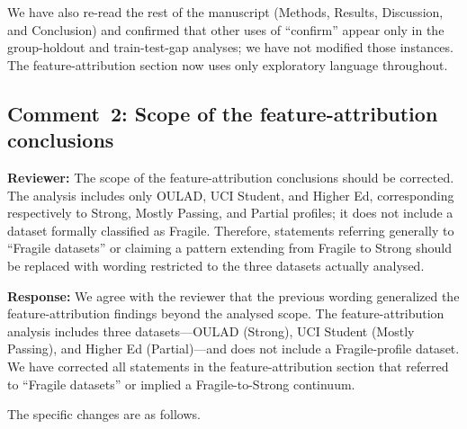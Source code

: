 \documentclass[10pt,letterpaper]{article}
\begin{document}
We have also re-read the rest of the manuscript (Methods, Results,
Discussion, and Conclusion) and confirmed that other uses of
``confirm'' appear only in the group-holdout and train-test-gap
analyses; we have not modified those instances. The feature-attribution
section now uses only exploratory language throughout.

\subsection*{Comment~2: Scope of the feature-attribution conclusions}

\textbf{Reviewer:} The scope of the feature-attribution conclusions
should be corrected. The analysis includes only OULAD, UCI Student, and
Higher Ed, corresponding respectively to Strong, Mostly Passing, and
Partial profiles; it does not include a dataset formally classified as
Fragile. Therefore, statements referring generally to ``Fragile
datasets'' or claiming a pattern extending from Fragile to Strong
should be replaced with wording restricted to the three datasets
actually analysed.

\textbf{Response:} We agree with the reviewer that the previous
wording generalized the feature-attribution findings beyond the
analysed scope. The feature-attribution analysis includes three
datasets---OULAD (Strong), UCI Student (Mostly Passing), and Higher Ed
(Partial)---and does not include a Fragile-profile dataset. We have
corrected all statements in the feature-attribution section that
referred to ``Fragile datasets'' or implied a Fragile-to-Strong
continuum.

The specific changes are as follows.
\end{document}
